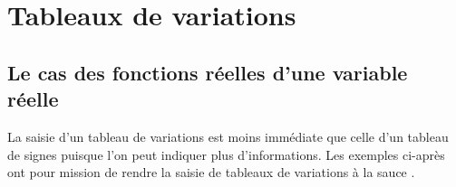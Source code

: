 \documentclass[10pt, a4paper]{article}
\begin{document}
\section{Tableaux de variations}

\subsection{Le cas des fonctions réelles d'une variable réelle}

La saisie d'un tableau de variations est moins immédiate que celle d'un tableau de signes puisque l'on peut indiquer plus d'informations. Les exemples ci-après ont pour mission de rendre  la saisie de tableaux de variations à la sauce \thispack.
\end{document}

